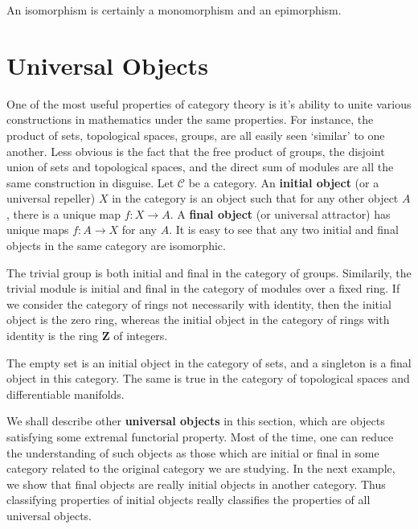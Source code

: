 An isomorphism is certainly a monomorphism and an epimorphism.

\section{Universal Objects}

One of the most useful properties of category theory is it's ability to unite various constructions in mathematics under the same properties. For instance, the product of sets, topological spaces, groups, are all easily seen `similar' to one another. Less obvious is the fact that the free product of groups, the disjoint union of sets and topological spaces, and the direct sum of modules are all the same construction in disguise. Let $\mathcal{C}$ be a category. An {\bf initial object} (or a universal repeller) $X$ in the category is an object such that for any other object $A$, there is a unique map $f: X \to A$. A {\bf final object} (or universal attractor) has unique maps $f: A \to X$ for any $A$. It is easy to see that any two initial and final objects in the same category are isomorphic.

\begin{example}
    The trivial group is both initial and final in the category of groups. Similarily, the trivial module is initial and final in the category of modules over a fixed ring. If we consider the category of rings not necessarily with identity, then the initial object is the zero ring, whereas the initial object in the category of rings with identity is the ring $\mathbf{Z}$ of integers.
\end{example}

\begin{example}
    The empty set is an initial object in the category of sets, and a singleton is a final object in this category. The same is true in the category of topological spaces and differentiable manifolds.
\end{example}

We shall describe other {\bf universal objects} in this section, which are objects satisfying some extremal functorial property. Most of the time, one can reduce the understanding of such objects as those which are initial or final in some category related to the original category we are studying. In the next example, we show that final objects are really initial objects in another category. Thus classifying properties of initial objects really classifies the properties of all universal objects.

